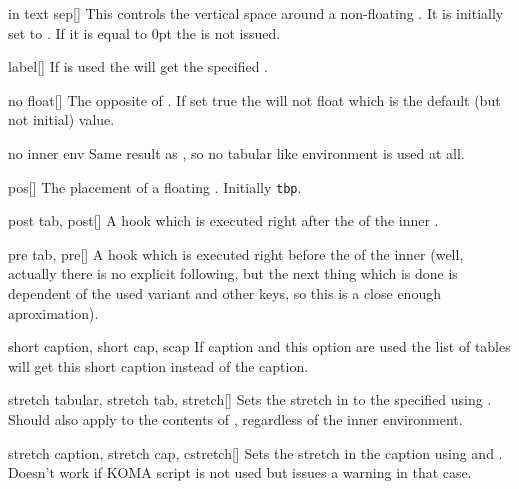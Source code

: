 \begin{describeopt}{in text sep}[]%
  This controls the vertical space around a non-floating . It is
  initially set to . If it is equal to 0pt the  is not
  issued.
\end{describeopt}%
\begin{describeopt}{label}[]%
  If  is used the  will get the specified
  .
\end{describeopt}%
\begin{describeopt}{no float}[]%
  The opposite of . If set true the  will not float
  which is the default (but not initial) value.
\end{describeopt}%
\begin{describeopt}{no inner env}%
  Same result as , so no tabular like
  environment is used at all.
\end{describeopt}%
\begin{describeopt}{pos}[]%
  The placement of a floating . Initially \texttt{tbp}.
\end{describeopt}%
\begin{describeopt}{post tab, post}[]%
  A hook which is executed right after the  of the inner
  .
\end{describeopt}%
\begin{describeopt}{pre tab, pre}[]%
  A hook which is executed right before the  of the inner
   (well, actually there is no explicit  following,
  but the next thing which is done is dependent of the used variant and other
  keys, so this is a close enough aproximation).
\end{describeopt}%
\begin{describeopt}{short caption, short cap, scap}%
  If caption and this option are used the list of tables will get this short
  caption instead of the caption.
\end{describeopt}%
\begin{describeopt}{stretch tabular, stretch tab, stretch}[]%
  Sets the stretch in  to the specified  using
  . Should also apply to the contents of ,
  regardless of the inner environment.
\end{describeopt}%
\begin{describeopt}{stretch caption, stretch cap, cstretch}[]%
  Sets the stretch in the caption using  and .
  Doesn't work if KOMA script is not used but issues a warning in that case.
\end{describeopt}%
